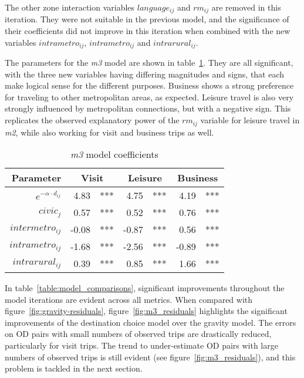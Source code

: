 The other zone interaction variables $language_{ij}$  and $rm_{ij}$  are removed in this iteration. They were not suitable in the previous model, and the significance of their coefficients did not improve in this iteration when combined with the new variables $intrametro_{ij}$,  $intrametro_{ij}$ and $intrarural_{ij}$.


The parameters for the \textit{m3} model are shown in table~\ref{table:m3-coeff}. They are all significant, with the three new variables having differing magnitudes and signs, that each make logical sense for the different purposes. Business shows a strong preference for traveling to other metropolitan areas, as expected. Leisure travel is also very strongly influenced by metropolitan connections, but with a negative sign. This replicates the observed explanatory power of the $rm_{ij}$ variable for leisure travel in \textit{m2}, while also working for visit and business trips as well.


\begin{table}[H]
\centering
\caption{\textit{m3} model coefficients}
\label{table:m3-coeff}
\begin{tabular}{@{}rrlrlrl@{}}
  \toprule
 Parameter & \multicolumn{2}{c}{Visit} & \multicolumn{2}{c}{Leisure} & \multicolumn{2}{c}{Business} \\ \midrule
  $e^{-\alpha \cdot d_{ij}}$ 	& 4.83 & *** & 4.75 & *** & 4.19 & *** \\  
  $civic_j$ & 0.57 & *** & 0.52 & *** & 0.76 & *** \\ 
  $intermetro_{ij}$ & -0.08 & *** & -0.87 & *** & 0.56 & *** \\ 
  $intrametro_{ij}$ & -1.68 & *** & -2.56 & *** & -0.89 & *** \\  
  $intrarural_{ij}$ & 0.39 & *** & 0.85 & *** & 1.66 & *** \\ 
   \bottomrule
\end{tabular}
\end{table}

In table~\ref{table:model_comparisons}, significant improvements throughout the model iterations are evident across all metrics. When compared with figure~\ref{fig:gravity-residuals}, figure~\ref{fig:m3_residuals} highlights the significant improvements of the destination choice model over the gravity model. The errors on OD pairs with small numbers of observed trips are drastically reduced, particularly for visit trips. The trend to under-estimate OD pairs with large numbers of observed trips is still evident (see figure~\ref{fig:m3_residuals}), and this problem is tackled in the next section. 


